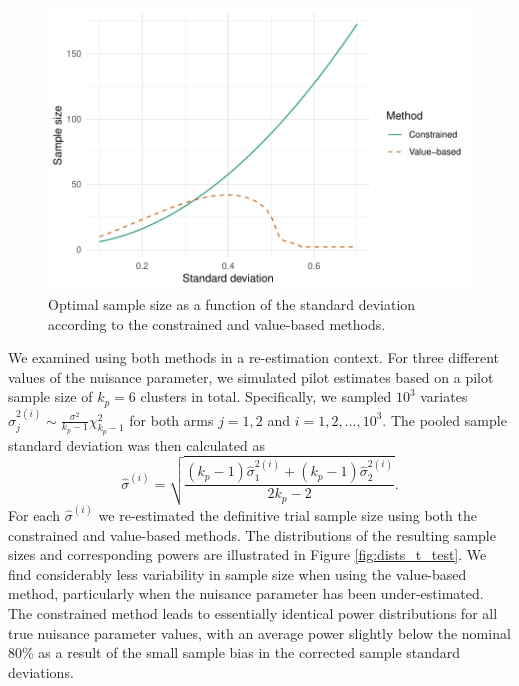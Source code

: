 \documentclass[sagev, Crown]{sagej}
\begin{document}
\begin{figure}
\centering
\includegraphics[scale=0.8]{./figures/opt_t_test}
\caption{Optimal sample size as a function of the standard deviation according to the constrained and value-based methods.}
\label{fig:opt_t_test}
\end{figure}

We examined using both methods in a re-estimation context. For three different values of the nuisance parameter, we simulated pilot estimates based on a pilot sample size of $k_p = 6$ clusters in total. Specifically, we sampled $10^3$ variates $\hat{\sigma}_j^{2 (i)} \sim \frac{\sigma^2}{k_p-1} \chi^2_{k_p-1}$ for both arms $j=1,2$ and $i = 1, 2, \ldots , 10^3$. The pooled sample standard deviation was then calculated as 
$$
\hat{\sigma}^{(i)} = \sqrt{\frac{(k_p - 1)\hat{\sigma}_1^{2 (i)} + (k_p - 1)\hat{\sigma}_2^{2 (i)}}{2k_p - 2}}.
$$
For each $\hat{\sigma}^{(i)}$ we re-estimated the definitive trial sample size using both the constrained and value-based methods. The distributions of the resulting sample sizes and corresponding powers are illustrated in Figure \ref{fig:dists_t_test}. We find considerably less variability in sample size when using the value-based method, particularly when the nuisance parameter has been under-estimated. The constrained method leads to essentially identical power distributions for all true nuisance parameter values, with an average power slightly below the nominal 80\% as a result of the small sample bias in the corrected sample standard deviations.

\end{document}

